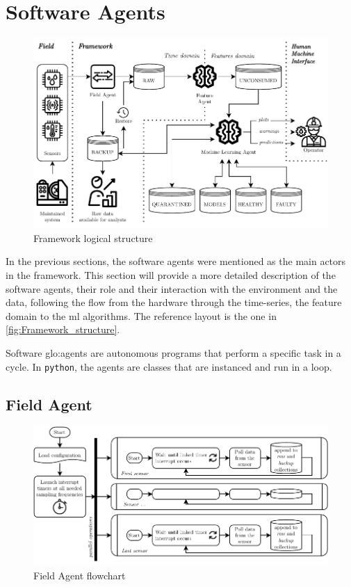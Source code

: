 \section{Software Agents}
\label{sec:agents}

\begin{figure}
    \centering
    \includegraphics[width=\textwidth]{images/Framework/Framework_structure.pdf}
    \caption{Framework logical structure}
    \label{fig:Framework_structure}
\end{figure}

In the previous sections, the software agents were mentioned as the main actors in the framework. This section will provide a more detailed description of the software agents, their role and their interaction with the environment and the data, following the flow from the hardware through the time-series, the feature domain to the \gls{ml} algorithms. The reference layout is the one in \autoref{fig:Framework_structure}. 

Software \gls{glo:agent}s are autonomous programs that perform a specific task in a cycle. In \texttt{python}, the agents are classes that are instanced and run in a loop.

\subsection{Field Agent}
\label{subsec:FieldAgent}
\begin{figure}
    \centering
    \includegraphics[scale=1]{images/Framework/Field_Agent_flowchart.pdf}
    \caption{Field Agent flowchart}
    \label{fig:Field_Agent_flowchart}
\end{figure}

